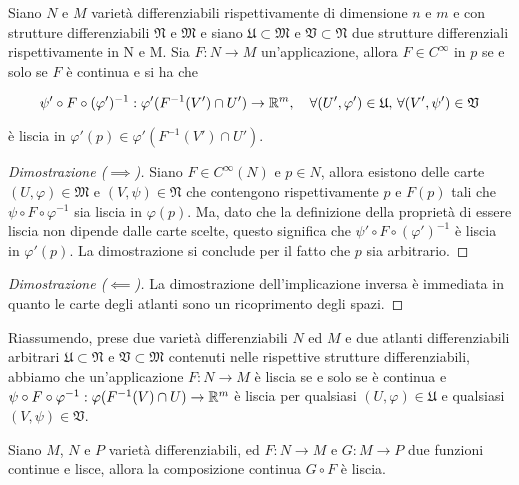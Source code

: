 \begin{definition}
	Siano $ N $ e $ M $ varietà differenziabili rispettivamente di dimensione  $ n $ e $ m $ e con strutture differenziabili $ \mathfrak{N} $ e $ \mathfrak{M} $ e siano $ \mathfrak{U} \subset \mathfrak{M} $ e $ \mathfrak{V} \subset \mathfrak{N} $ due strutture differenziali rispettivamente in N e M. Sia $ F : N \to M $ un'applicazione, allora $ F \in C^{\infty} $ in $ p $ se e solo se $ F $ è continua e si ha che
	
	\begin{equation}
		\psi' \circ F \circ (\varphi')^{-1} : \varphi'(F^{-1}(V') \cap U') \to \R^{m} \qcomma \forall (U',\varphi') \in \mathfrak{U}, \, \forall (V',\psi') \in \mathfrak{V}
	\end{equation}

	è liscia in $ \varphi'(p) \in \varphi'(F^{-1}(V') \cap U') $.
\end{definition}

\begin{proof}[Dimostrazione ($ \implies $)]
	Siano $ F \in C^{\infty}(N) $ e $ p \in N $, allora esistono delle carte $ (U,\varphi) \in \mathfrak{M} $ e $ (V,\psi) \in \mathfrak{N} $ che contengono rispettivamente $ p $ e $ F(p) $ tali che $ \psi \circ F \circ \varphi^{-1} $ sia liscia in $ \varphi(p) $. Ma, dato che la definizione della proprietà di essere liscia non dipende dalle carte scelte, questo significa che $ \psi' \circ F \circ (\varphi')^{-1} $ è liscia in $ \varphi'(p) $. La dimostrazione si conclude per il fatto che $ p $ sia arbitrario.
\end{proof}

\begin{proof}[Dimostrazione ($ \impliedby $)]
	La dimostrazione dell'implicazione inversa è immediata in quanto le carte degli atlanti sono un ricoprimento degli spazi.
\end{proof}

Riassumendo, prese due varietà differenziabili $ N $ ed $ M $ e due atlanti differenziabili arbitrari $ \mathfrak{U} \subset \mathfrak{N} $ e $ \mathfrak{V} \subset \mathfrak{M} $ contenuti nelle rispettive strutture differenziabili, abbiamo che un'applicazione $ F : N \to M $ è liscia se e solo se è continua e $ \psi \circ F \circ \varphi^{-1} : \varphi(F^{-1}(V) \cap U) \to \mathbb{R}^{m} $ è liscia per qualsiasi $ (U,\varphi) \in \mathfrak{U} $ e qualsiasi $ (V,\psi) \in \mathfrak{V} $.

\begin{definition}
	Siano $ M $, $ N $ e $ P $ varietà differenziabili, ed $ F : N \to M $ e $ G : M \to P $ due funzioni continue e lisce, allora la composizione continua $ G \circ F $ è liscia.
\end{definition}

